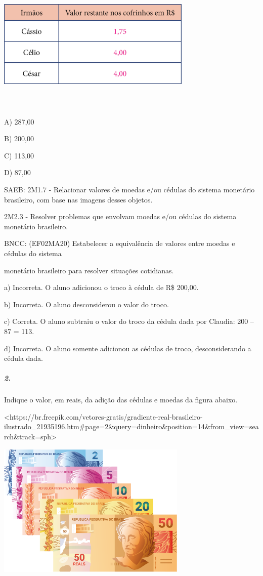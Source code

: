 \includegraphics[width=3.65497in,height=2.60417in]{media/image77.png}

A) 287,00

B) 200,00

C) 113,00

D) 87,00

SAEB: 2M1.7 - Relacionar valores de moedas e/ou cédulas do sistema
monetário brasileiro, com base nas imagens desses objetos.

2M2.3 - Resolver problemas que envolvam moedas e/ou cédulas do sistema
monetário brasileiro.

BNCC: (EF02MA20) Estabelecer a equivalência de valores entre moedas e
cédulas do sistema

monetário brasileiro para resolver situações cotidianas.

a) Incorreta. O aluno adicionou o troco à cédula de R\$ 200,00.

b) Incorreta. O aluno desconsiderou o valor do troco.

c) Correta. O aluno subtraiu o valor do troco da cédula dada por
Claudia: 200 -- 87 = 113.

d) Incorreta. O aluno somente adicionou as cédulas de troco,
desconsiderando a cédula dada.

\subparagraph{2. }\label{section-66}

Indique o valor, em reais, da adição das cédulas e moedas da figura
abaixo.

\textless{}https://br.freepik.com/vetores-gratis/gradiente-real-brasileiro-ilustrado\_21935196.htm\#page=2\&query=dinheiro\&position=14\&from\_view=search\&track=sph\textgreater{}

\includegraphics[width=3.56250in,height=2.54570in]{media/image78.png}

